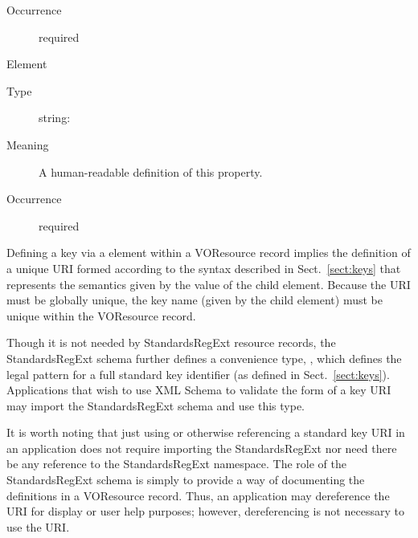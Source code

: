 \documentclass[11pt,a4paper]{ivoa}
\begin{document}
\begin{generated}
\begin{bigdescription}
\begin{description}
\item[Occurrence] required


\end{description}
\item[Element \xmlel{description}]
\begin{description}
\item[Type] string: 
\item[Meaning] 
                  A human-readable definition of this property.  
               
\item[Occurrence] required

\end{description}


\end{bigdescription}\endgroup

\endgroup
\end{generated}



Defining a key via a  element within a
VOResource record implies the definition of a unique URI formed
according to the syntax described in Sect.~\ref{sect:keys}
that represents the semantics given by the value of the 
 child element.  Because the URI must
be globally unique, the key name (given by the
 child element) must be unique within the
VOResource record.

Though it is not needed by StandardsRegExt resource records, the StandardsRegExt
schema further defines a convenience type,
, which defines the legal pattern for
a full standard key identifier (as defined in
Sect.~\ref{sect:keys}).  Applications that wish to use
XML Schema to validate the form of a key URI may import the StandardsRegExt
schema and use this type.  


\begin{admonition}[Note]
It is worth noting that just using or otherwise referencing a
standard key URI in an application does not require importing
the StandardsRegExt nor need there be any reference to the
StandardsRegExt namespace.  The role of the StandardsRegExt schema is
simply to provide a way of documenting the definitions in a
VOResource record.  Thus, an application may dereference the
URI for display or user help purposes; however, dereferencing
is not necessary to use the URI. 
\end{admonition}


\appendix
\end{document}
